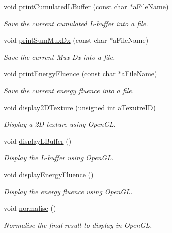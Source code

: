 \begin{DoxyCompactItemize}
void \hyperlink{classg_virtual_x_ray_1_1_x_ray_renderer_abdf17ddb1dfb9f96c6577d8aa7a6c6d8}{printCumulatedLBuffer} (const char $\ast$aFileName)
\begin{DoxyCompactList}\small\item\em Save the current cumulated L-\/buffer into a file. \end{DoxyCompactList}\item 
void \hyperlink{classg_virtual_x_ray_1_1_x_ray_renderer_a3e110bcab5cfa58ac074ba54a3549dcc}{printSumMuxDx} (const char $\ast$aFileName)
\begin{DoxyCompactList}\small\item\em Save the current Mux Dx into a file. \end{DoxyCompactList}\item 
void \hyperlink{classg_virtual_x_ray_1_1_x_ray_renderer_a5ed67ac0091620328f9e0ca11b3725d5}{printEnergyFluence} (const char $\ast$aFileName)
\begin{DoxyCompactList}\small\item\em Save the current energy fluence into a file. \end{DoxyCompactList}\item 
void \hyperlink{classg_virtual_x_ray_1_1_x_ray_renderer_a204c83d6cce239e173f2fa3679ac8820}{display2DTexture} (unsigned int aTexutreID)
\begin{DoxyCompactList}\small\item\em Display a 2D texture using OpenGL. \end{DoxyCompactList}\item 
void \hyperlink{classg_virtual_x_ray_1_1_x_ray_renderer_a34ee8ba527acf9da3199d54181521f2e}{displayLBuffer} ()
\begin{DoxyCompactList}\small\item\em Display the L-\/buffer using OpenGL. \end{DoxyCompactList}\item 
void \hyperlink{classg_virtual_x_ray_1_1_x_ray_renderer_adece8b06fc47cad618596a378361c273}{displayEnergyFluence} ()
\begin{DoxyCompactList}\small\item\em Display the energy fluence using OpenGL. \end{DoxyCompactList}\item 
void \hyperlink{classg_virtual_x_ray_1_1_x_ray_renderer_abbd6c87260c167ca3b58874114cb89ac}{normalise} ()
\begin{DoxyCompactList}\small\item\em Normalise the final result to display in OpenGL. \end{DoxyCompactList}\item 

\end{DoxyCompactItemize}
